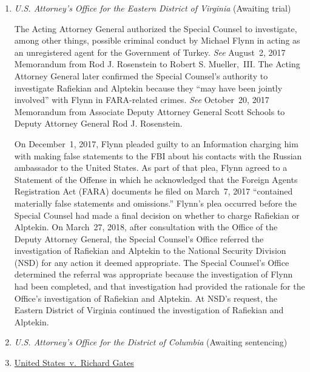 \begin{enumerate}[1.]

\item {}

\textit{U.S. Attorney's Office for the Eastern District of Virginia}\hfil\break
(Awaiting trial)

The Acting Attorney General authorized the Special Counsel to investigate, among other things, possible criminal conduct by Michael Flynn in acting as an unregistered agent for the Government of Turkey.
\textit{See} August~2, 2017 Memorandum from Rod J. Rosenstein to Robert S. Mueller,~III\null.
The Acting Attorney General later confirmed the Special Counsel's authority to investigate Rafiekian and Alptekin because they ``may have been jointly involved'' with Flynn in FARA-related crimes.
\textit{See} October~20, 2017 Memorandum from Associate Deputy Attorney General Scott Schools to Deputy Attorney General Rod J. Rosenstein.

On December~1, 2017, Flynn pleaded guilty to an Information charging him with making false statements to the FBI about his contacts with the Russian ambassador to the United States.
As part of that plea, Flynn agreed to a Statement of the Offense in which he acknowledged that the Foreign Agents Registration Act (FARA) documents he filed on March~7, 2017 ``contained materially false statements and omissions.''
Flynn's plea occurred before the Special Counsel had made a final decision on whether to charge Rafiekian or Alptekin.
On March~27, 2018, after consultation with the Office of the Deputy Attorney General, the Special Counsel's Office referred the investigation of Rafiekian and Alptekin to the National Security Division (NSD) for any action it deemed appropriate.
The Special Counsel's Office determined the referral was appropriate because the investigation of Flynn had been completed, and that investigation had provided the rationale for the Office's investigation of Rafiekian and Alptekin.
At NSD's request, the Eastern District of Virginia continued the investigation of Rafiekian and Alptekin.

    \item {}

\textit{U.S. Attorney's Office for the District of Columbia}\hfil\break
(Awaiting sentencing)

    \item \underline{United States~v.\ Richard Gates}


\end{enumerate}
